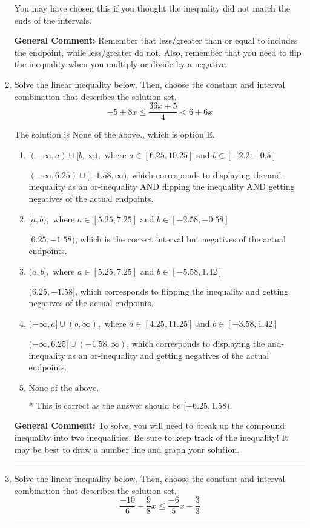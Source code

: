 \documentclass{extbook}[14pt]
\newcommand{\litem}[1]{\item #1

\rule{\textwidth}{0.4pt}}
\begin{document}
\begin{enumerate}
{\begin{enumerate}[label=\Alph*.]
You may have chosen this if you thought the inequality did not match the ends of the intervals.
\end{enumerate}

\textbf{General Comment:} Remember that less/greater than or equal to includes the endpoint, while less/greater do not. Also, remember that you need to flip the inequality when you multiply or divide by a negative.
}
\litem{
Solve the linear inequality below. Then, choose the constant and interval combination that describes the solution set.
\[ -5 + 8 x \leq \frac{36 x + 5}{4} < 6 + 6 x \]

The solution is \( \text{None of the above.} \), which is option E.\begin{enumerate}[label=\Alph*.]
\item \( (-\infty, a) \cup [b, \infty), \text{ where } a \in [6.25, 10.25] \text{ and } b \in [-2.2, -0.5] \)

$(-\infty, 6.25) \cup [-1.58, \infty)$, which corresponds to displaying the and-inequality as an or-inequality AND flipping the inequality AND getting negatives of the actual endpoints.
\item \( [a, b), \text{ where } a \in [5.25, 7.25] \text{ and } b \in [-2.58, -0.58] \)

$[6.25, -1.58)$, which is the correct interval but negatives of the actual endpoints.
\item \( (a, b], \text{ where } a \in [5.25, 7.25] \text{ and } b \in [-5.58, 1.42] \)

$(6.25, -1.58]$, which corresponds to flipping the inequality and getting negatives of the actual endpoints.
\item \( (-\infty, a] \cup (b, \infty), \text{ where } a \in [4.25, 11.25] \text{ and } b \in [-3.58, 1.42] \)

$(-\infty, 6.25] \cup (-1.58, \infty)$, which corresponds to displaying the and-inequality as an or-inequality and getting negatives of the actual endpoints.
\item \( \text{None of the above.} \)

* This is correct as the answer should be $[-6.25, 1.58)$.
\end{enumerate}

\textbf{General Comment:} To solve, you will need to break up the compound inequality into two inequalities. Be sure to keep track of the inequality! It may be best to draw a number line and graph your solution.
}
\litem{
Solve the linear inequality below. Then, choose the constant and interval combination that describes the solution set.
\[ \frac{-10}{6} - \frac{9}{8} x \leq \frac{-6}{5} x - \frac{3}{3} \]

}
\end{enumerate}
\end{document}
